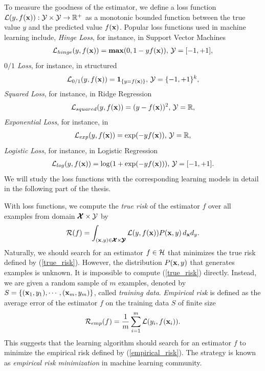 To measure the goodness of the estimator, we define a loss function $\mathcal{L}(y,f(\mathbf {x})):\mathcal{Y}\times\mathcal{Y}\rightarrow\mathbb{R}^+$ as a monotonic bounded function between the true value $y$ and the predicted value $f(\mathbf {x})$.
Popular loss functions used in machine learning include,
\textit{Hinge Loss}, for instance, in Support Vector Machines \citep{Cortes95support}
\begin{align}
	\mathcal{L}_{hinge}(y,f(\mathbf {x})) = \textbf{max} (0,1-y f(\mathbf {x})),\, \mathcal{Y}=[-1,+1], \label{hinge_loss}
\end{align}
\textit{$0/1$ Loss}, for instance, in structured \svm\ \citep{THJA04}
\begin{align}
	\mathcal{L}_{0/1}(y,f(\mathbf {x})) = \mathbf{1}_{\{y=f(\mathbf {x})\}},\, \mathcal{Y} = \{-1,+1\}^k, \label{one_loss}
\end{align}
\textit{Squared Loss}, for instance, in Ridge Regression \citep{Hoerl00ridge}
\begin{align*}
	\mathcal{L}_{squared}(y,f(\mathbf {x})) = (y-f(\mathbf {x}))^2,\, \mathcal{Y}=\mathbb{R},
\end{align*}
\textit{Exponential Loss}, for instance, in \adaboost\ \citep{Schapire99improved}
\begin{align}
	\mathcal{L}_{exp}(y,f(\mathbf {x})) = \exp(-y f(\mathbf {x})),\, \mathcal{Y}=\mathbb{R}, \label{exp_loss}
\end{align}
\textit{Logistic Loss}, for instance, in Logistic Regression \citep{Chen99}
\begin{align}
	\mathcal{L}_{log}(y,f(\mathbf {x})) = \log(1+\exp(-y f(\mathbf {x}))),\, \mathcal{Y}=[-1,+1]. \label{log_loss}
\end{align}
We will study the loss functions with the corresponding learning models in detail in the following part of the thesis.

With loss functions, we compute the \textit{true risk} of the estimator $f$ over all examples from domain $\pmb {\mathcal{X}}\times\mathcal{Y}$ by
\begin{align}
	\mathcal{R}(f) = \int_{(\mathbf {x},y)\in\pmb {\mathcal{X}}\times\pmb {\mathcal{Y}}}\mathcal{L}(y,f(\mathbf {x}))P(\mathbf {x},y)\,d_{\mathbf {x}}d_{y} \label{true_risk}.
\end{align}
Naturally, we should search for an estimator $f\in\mathcal{H}$ that minimizes the true risk defined by (\ref{true_risk}).
However, the distribution $P(\mathbf {x},y)$ that generates examples is unknown.
It is impossible to compute (\ref{true_risk}) directly.
Instead, we are given a random sample of $m$ examples, denoted by $S=\{(\mathbf {x}_1,y_1),\cdots,(\mathbf {x}_m,y_m)\}$, called \textit{training data}.
\textit{Empirical risk} is defined as the average error of the estimator $f$ on the training data $S$ of finite size
\begin{align}
	\mathcal{R}_{emp}(f) = \frac{1}{m}\sum_{i=1}^{m}\mathcal{L}(y_i,f(\mathbf {x}_i)) \label{empirical_risk}.
\end{align}
This suggests that the learning algorithm should search for an estimator $f$ to minimize the empirical risk defined by (\ref{empirical_risk}).
The strategy is known as \textit{empirical risk minimization} \citep{Vapnik92principles} in machine learning community.

